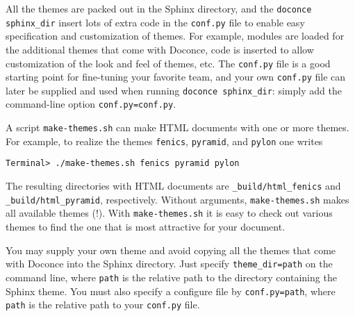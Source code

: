 \documentclass[%
oneside,                 %
final,                   %
10pt]{article}
\begin{document}
All the themes are packed out in the Sphinx directory, and the
{\fontsize{10pt}{10pt}\Verb!doconce sphinx_dir!} insert lots of extra code in the {\fontsize{10pt}{10pt}\Verb!conf.py!}
file to enable easy specification and customization of themes.
For example, modules are loaded for the additional themes that
come with Doconce, code is inserted to allow customization of
the look and feel of themes, etc. The {\fontsize{10pt}{10pt}\Verb!conf.py!} file is a
good starting point for fine-tuning your favorite team, and your
own {\fontsize{10pt}{10pt}\Verb!conf.py!} file can later be supplied and used when running
{\fontsize{10pt}{10pt}\Verb!doconce sphinx_dir!}: simply add the command-line option
{\fontsize{10pt}{10pt}\Verb!conf.py=conf.py!}.

A script
{\fontsize{10pt}{10pt}\Verb!make-themes.sh!} can make HTML documents with one or more themes.
For example,
to realize the themes {\fontsize{10pt}{10pt}\Verb!fenics!}, {\fontsize{10pt}{10pt}\Verb!pyramid!}, and {\fontsize{10pt}{10pt}\Verb!pylon!} one writes
\vspace{4pt}
\begin{Verbatim}[numbers=none,frame=lines,label=\fbox{{\tiny Terminal}},fontsize=\fontsize{9pt}{9pt},
labelposition=topline,framesep=2.5mm,framerule=0.7pt]
Terminal> ./make-themes.sh fenics pyramid pylon
\end{Verbatim}
The resulting directories with HTML documents are {\fontsize{10pt}{10pt}\Verb!_build/html_fenics!}
and {\fontsize{10pt}{10pt}\Verb!_build/html_pyramid!}, respectively. Without arguments,
{\fontsize{10pt}{10pt}\Verb!make-themes.sh!} makes all available themes (!). With {\fontsize{10pt}{10pt}\Verb!make-themes.sh!}
it is easy to check out various themes to find the one that is most
attractive for your document.

You may supply your own theme and avoid copying all the themes
that come with Doconce into the Sphinx directory. Just specify
{\fontsize{10pt}{10pt}\Verb!theme_dir=path!} on the command line, where {\fontsize{10pt}{10pt}\Verb!path!} is the relative
path to the directory containing the Sphinx theme. You must also
specify a configure file by {\fontsize{10pt}{10pt}\Verb!conf.py=path!}, where {\fontsize{10pt}{10pt}\Verb!path!} is the
relative path to your {\fontsize{10pt}{10pt}\Verb!conf.py!} file.
\end{document}
